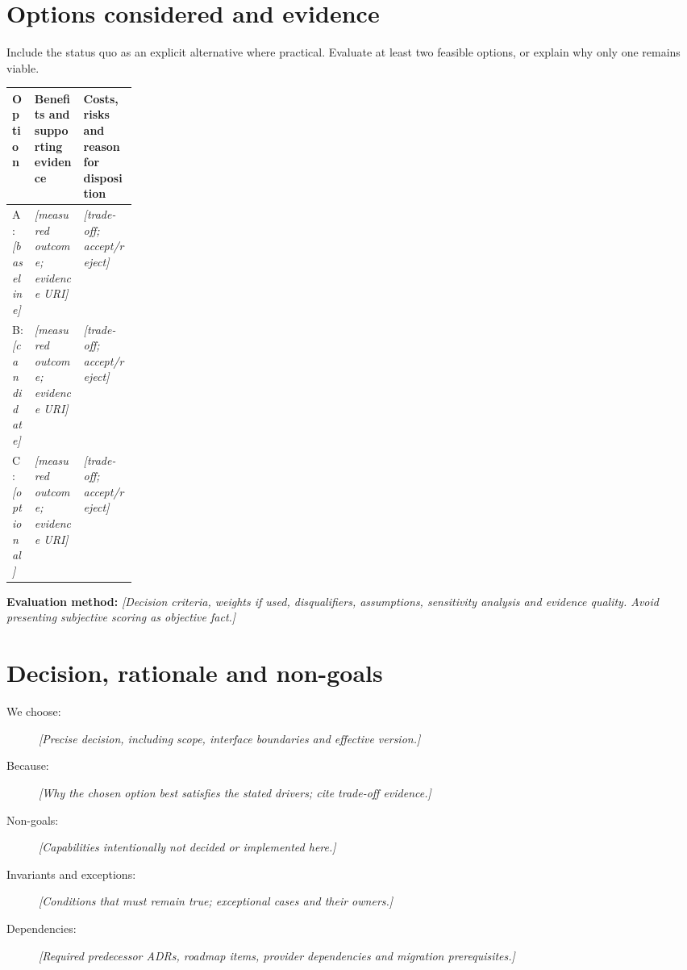\documentclass[11pt,letterpaper]{article}
\begin{document}
\section{Options considered and evidence}
Include the status quo as an explicit alternative where practical. Evaluate
at least two feasible options, or explain why only one remains viable.
\par\noindent\begin{tabularx}{\linewidth}{@{}>{\raggedright\arraybackslash}p{0.18\linewidth}>{\raggedright\arraybackslash}X >{\raggedright\arraybackslash}X@{}}
\toprule
\textbf{Option} & \textbf{Benefits and supporting evidence} & \textbf{Costs, risks and reason for disposition}\\
\midrule
A: \emph{[baseline]} & \emph{[measured outcome; evidence URI]} & \emph{[trade-off; accept/reject]}\\
B: \emph{[candidate]} & \emph{[measured outcome; evidence URI]} & \emph{[trade-off; accept/reject]}\\
C: \emph{[optional]} & \emph{[measured outcome; evidence URI]} & \emph{[trade-off; accept/reject]}\\
\bottomrule
\end{tabularx}\par

\noindent\textbf{Evaluation method:} \emph{[Decision criteria, weights if used,
disqualifiers, assumptions, sensitivity analysis and evidence quality. Avoid
presenting subjective scoring as objective fact.]}

\section{Decision, rationale and non-goals}
\begin{description}
\item[We choose:] \emph{[Precise decision, including scope, interface boundaries and effective version.]}
\item[Because:] \emph{[Why the chosen option best satisfies the stated drivers; cite trade-off evidence.]}
\item[Non-goals:] \emph{[Capabilities intentionally not decided or implemented here.]}
\item[Invariants and exceptions:] \emph{[Conditions that must remain true; exceptional cases and their owners.]}
\item[Dependencies:] \emph{[Required predecessor ADRs, roadmap items, provider dependencies and migration prerequisites.]}
\end{description}
\end{document}
